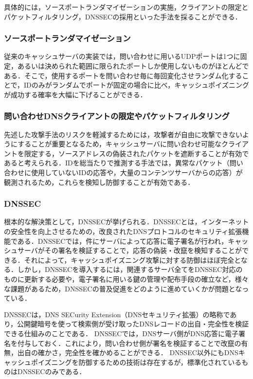 具体的には，ソースポートランダマイゼーションの実施，クライアントの限定とパケットフィルタリング，DNSSECの採用といった手法を採ることができる．

\subsubsection{ソースポートランダマイゼーション}
従来のキャッシュサーバの実装では，問い合わせに用いるUDPポートは1つに固定，あるいは決められた範囲に限られたポートしか使用しないものがほとんどである．そこで，使用するポートを問い合わせ毎に毎回変化させランダム化することで，IDのみがランダムでポートが固定の場合に比べ，キャッシュポイズニングが成功する確率を大幅に下げることができる．

\subsubsection{問い合わせDNSクライアントの限定やパケットフィルタリング}
先述した攻撃手法のリスクを軽減するためには，攻撃者が自由に攻撃できないようにすることが重要となるため，キャッシュサーバに問い合わせ可能なクライアントを限定する，ソースアドレスの偽装されたパケットを遮断することが有効であると考えられる．IDを総当たりで推測する手法では，異常なパケット（問い合わせに使用していないIDの応答や，大量のコンテンツサーバからの応答）が観測されるため，これらを検知し防御することが有効である．

\subsubsection{DNSSEC}
根本的な解決策として，DNSSECが挙げられる．DNSSECとは，インターネットの安全性を向上させるための，改良されたDNSプロトコルのセキュリティ拡張機能である．DNSSECでは，件にサーバによって応答に電子署名が行われ，キャッシュサーバがその署名を検証することで，応答の偽装・改竄を検知することができる．それによって，キャッシュポイズニング攻撃に対する防御はほぼ完全となる．しかし，DNSSECを導入するには，関連するサーバ全てをDNSSEC対応のものに更新する必要や，電子署名に用いる鍵の管理や配布手段の確立など，様々な課題があるため，DNSSECの普及促進をどのように進めていくかが問題となっている．

DNSSECは，DNS SECurity Extension（DNSセキュリティ拡張）の略称であり，公開鍵暗号を使って検索側が受け取ったDNSレコードの出自・完全性を検証できる仕組みのことである．\cite{dnssec}
DNSSECでは，DNSサーバ側がDNS応答に電子署名を付与しておく．これにより，問い合わせ側が署名を検証することで改竄の有無，出自の確かさ，完全性を確かめることができる．
DNSSEC以外にもDNSキャッシュポイズニングを防御するための技術は存在するが，標準化されているものはDNSSECのみである．\cite{RFC2535} \cite{RFC3110} \cite{RFC4033}

